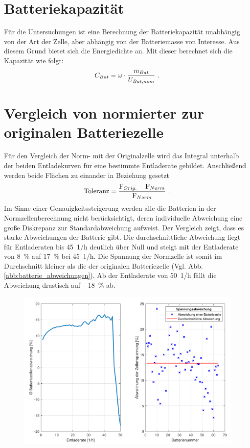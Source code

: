 \begin{appendix}
\section{Batteriekapazität}
Für die Untersuchungen ist eine Berechnung der Batteriekapazität unabhängig von der Art der Zelle, aber abhängig von der Batteriemasse von Interesse.
Aus diesem Grund bietet sich die Energiedichte an. 
Mit dieser berechnet sich die Kapazität wie folgt:
\begin{equation}
	C_{Bat}	= \omega\cdot\frac{m_{Bat}}{U_{Bat,nom}} ~\text{.}
	\label{eq:batteriekapazitaet}
\end{equation}


\section{Vergleich von normierter zur originalen Batteriezelle}
\label{sec:norm_vs_orig}
Für den Vergleich der Norm- mit der Originalzelle wird das Integral unterhalb der beiden Entladekurven für eine bestimmte Entladerate gebildet. Anschließend werden beide Flächen zu einander in Beziehung gesetzt 
\begin{equation}
	\text{Toleranz} = \frac{\text{F}_{Orig.}-\text{F}_{Norm}}{\text{F}_{Norm}} ~\text{.}
\end{equation} 
Im Sinne einer Genauigkeitssteigerung werden alle die Batterien in der Normzellenberechnung nicht berücksichtigt, deren individuelle Abweichung eine große Diskrepanz zur Standardabweichung aufweist. Der Vergleich zeigt, dass es starke Abweichungen der Batterie gibt. Die durchschnittliche Abweichung liegt für Entladeraten bis \SI{45}{1/h} deutlich über Null und steigt mit der Entladerate von \SI{8}{\%} auf \SI{17}{\%} bei \SI{45}{1/h}. Die Spannung der Normzelle ist somit im Durchschnitt kleiner als die der originalen Batteriezelle (Vgl. Abb. \ref{abb:batterie_abweichungen}). Ab der Entladerate von \SI{50}{1/h} fällt die Abweichung drastisch auf \SI{-18}{\%} ab. 
\begin{figure}[H]
\centering
	\includegraphics[scale=0.7]{Diagramme/Abweichungen.pdf}

\end{figure}
\end{appendix}
